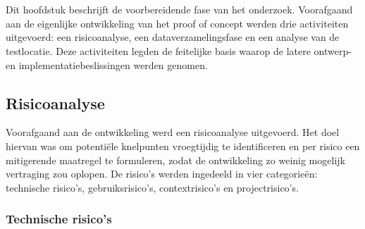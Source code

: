 \chapter{}
\label{ch:voorbereiding-analyse}

Dit hoofdstuk beschrijft de voorbereidende fase van het onderzoek. Voorafgaand aan de eigenlijke ontwikkeling van het proof of concept werden drie activiteiten uitgevoerd: een risicoanalyse, een dataverzamelingsfase en een analyse van de testlocatie. Deze activiteiten legden de feitelijke basis waarop de latere ontwerp- en implementatiebeslissingen werden genomen.

\section{Risicoanalyse}

Voorafgaand aan de ontwikkeling werd een risicoanalyse uitgevoerd. Het doel hiervan was om potentiële knelpunten vroegtijdig te identificeren en per risico een mitigerende maatregel te formuleren, zodat de ontwikkeling zo weinig mogelijk vertraging zou oplopen. De risico's werden ingedeeld in vier categorieën: technische risico's, gebruiksrisico's, contextrisico's en projectrisico's.

\subsection{Technische risico's}

